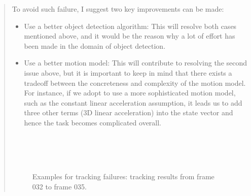 \documentclass[11pt]{article}
\begin{document}
\begin{quote}
To avoid such failure, I suggest two key improvements can be made:
\begin{itemize}
    \item Use a better object detection algorithm: This will resolve both cases mentioned above, and it would be the reason why a lot of effort has been made in the domain of object detection.
    \item Use a better motion model: This will contribute to resolving the second issue above, but it is important to keep in mind that there exists a tradeoff between the concreteness and complexity of the motion model. For instance, if we adopt to use a more sophisticated motion model, such as the constant linear acceleration assumption, it leads us to add three other terms (3D linear acceleration) into the state vector and hence the task becomes complicated overall.
\end{itemize}

\begin{figure}[h]
    \centering
     \\
     \\
     \\
    \caption{Examples for tracking failures: tracking results from frame 032 to frame 035.}
    \label{fig:q7-1}
\end{figure}


\end{quote}
\end{document}
